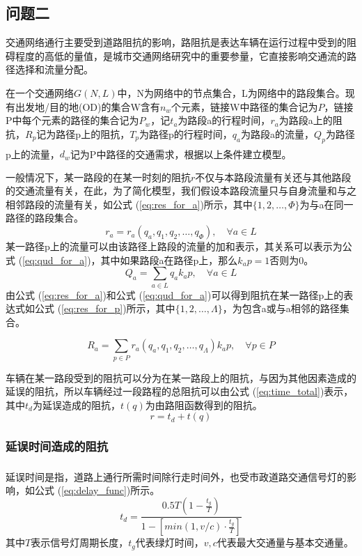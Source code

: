 \documentclass[fontset=windows,a4paper,12pt]{ctexart}
\newcommand{\upcite}[1]{\textsuperscript{\textsuperscript{\cite{#1}}}}
\renewcommand{\eqref}[1]{公式 (\ref{#1})}
\begin{document}
	\subsection{问题二}
		交通网络通行主要受到道路阻抗的影响，路阻抗是表达车辆在运行过程中受到的阻碍程度的高低的量值，是城市交通网络研究中的重要参量，它直接影响交通流的路径选择和流量分配。
		
		在一个交通网络$G(N,L)$中，N为网络中的节点集合，L为网络中的路段集合。现有出发地/目的地(OD)的集合W含有$n_w$个元素，链接W中路径的集合记为$P$，链接P中每个元素的路径的集合记为$P_w$，记$t_a$为路段a的行程时间，$r_a$为路段a上的阻抗，$R_p$记为路径p上的阻抗，$T_p$为路径p的行程时间，$q_a$为路段a的流量，$Q_p$为路径p上的流量，$d_w$记为P中路径的交通需求，根据以上条件建立模型\upcite{赵春雪2012拥挤交通网络的}。
		
		一般情况下，某一路段的在某一时刻的阻抗$r$不仅与本路段流量有关还与其他路段的交通流量有关，在此，为了简化模型，我们假设本路段流量只与自身流量和与之相邻路段的流量有关，如\eqref{eq:res_for_a}所示，其中$\{1,2,\dots,\varPhi\}$为与a在同一路径的路段集合。
		\begin{equation}
			r_a=r_a(q_a,q_1,q_2,\dots,q_\varPhi),\quad\forall a \in L
			\label{eq:res_for_a}
		\end{equation}
		某一路径p上的流量可以由该路径上路段的流量的加和表示，其关系可以表示为\eqref{eq:qud_for_a}，其中如果路段a在路径p上，那么$k_ap=1$否则为0。
		\begin{equation}
			Q_a=\sum\limits_{a\in L}q_ak_ap,\quad\forall a \in L
			\label{eq:qud_for_a}
		\end{equation}
		由\eqref{eq:res_for_a}和\eqref{eq:qud_for_a}可以得到阻抗在某一路径p上的表达式如\eqref{eq:res_for_p}所示，其中$\{1,2,\dots,\Lambda\}$，为包含a或与a相邻的路径集合。
		
		\begin{equation}
			R_a=\sum\limits_{p\in P}r_a(q_a,q_1,q_2,\dots,q_\Lambda)k_ap,\quad\forall p \in P
			\label{eq:res_for_p}
		\end{equation}
		
		车辆在某一路段受到的阻抗可以分为在某一路段上的阻抗，与因为其他因素造成的延误的阻抗，所以车辆经过一段路程的总阻抗可以由\eqref{eq:time_total}表示，其中$ t_d $为延误造成的阻抗，$t(q)$为由路阻函数得到的阻抗。
		\begin{equation}
			r = t_d + t(q)
			\label{eq:time_total}
		\end{equation}		
		
		\subsubsection{延误时间造成的阻抗}
			延误时间\upcite{任福田2003交通工程学}是指，道路上通行所需时间除行走时间外，也受市政道路交通信号灯的影响，如\eqref{eq:delay_func}所示。
			\begin{equation}
				t_d=\frac{0.5T(1-\frac{t_g}{T})}{1-[min(1,v/c)\cdot{\frac{t_g}{T}}]}
				\label{eq:delay_func}
			\end{equation}
			其中$ T $表示信号灯周期长度，$ t_g $代表绿灯时间，$ v,c $代表最大交通量与基本交通量。
			
\end{document}
